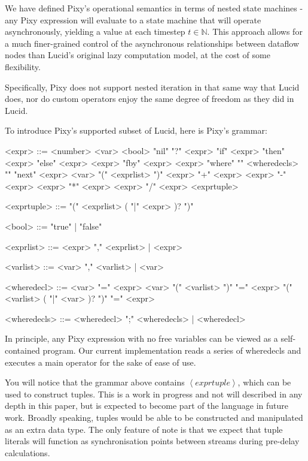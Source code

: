 \documentclass{scrartcl}
\begin{document}
    We have defined Pixy's operational semantics in terms of nested state machines - any Pixy expression will evaluate to a state machine that will operate asynchronously, yielding a value at each timestep $t \in \mathbb{N}$.
    This approach allows for a much finer-grained control of the asynchronous relationships between dataflow nodes than Lucid's original lazy computation model, at the cost of some flexibility.
    
    Specifically, Pixy does not support nested iteration in that same way that Lucid does, nor do custom operators enjoy the same degree of freedom as they did in Lucid.
    
    To introduce Pixy's supported subset of Lucid, here is Pixy's grammar:
    
    \begin{grammar}
        <expr> ::= <number>
        \alt <var>
        \alt <bool>
        \alt "nil"
        \alt "?" <expr>
        \alt "if" <expr> "then" <expr> "else" <expr>
        \alt <expr> "fby" <expr>
        \alt <expr> "where" "{" <wheredecls> "}"
        \alt "next" <expr>
        \alt <var> "(" <exprlist> ")"
        \alt <expr> "+" <expr>
        \alt <expr> "-" <expr>
        \alt <expr> "*" <expr>
        \alt <expr> "/" <expr>
        \alt <exprtuple>
        
        <exprtuple> ::= "(" <exprlist> ( "|" <expr> )? ")"
        
        <bool> ::= "true" | "false"
        
        <exprlist> ::= <expr> "," <exprlist> | <expr>
        
        <varlist> ::= <var> "," <varlist> | <var>
        
        <wheredecl> ::= <var> "=" <expr> 
        \alt <var> "(" <varlist> ")" "=" <expr>
        \alt "(" <varlist> ( "|" <var> )? ")" "=" <expr>
        
        <wheredecls> ::= <wheredecl> ";" <wheredecls> | <wheredecl>
    \end{grammar}

    In principle, any Pixy expression with no free variables can be viewed as a self-contained program. Our current implementation reads a series of wheredecls and executes a main operator for the sake of ease of use.
    
    You will notice that the grammar above contains $\left<exprtuple \right>$, which can be used to construct tuples. This is a work in progress and not will described in any depth in this paper, but is expected to become part of the language in future work. Broadly speaking, tuples would be able to be constructed and manipulated as an extra data type. The only feature of note is that we expect that tuple literals will function as synchronisation points between streams during pre-delay calculations.
    
\end{document}
